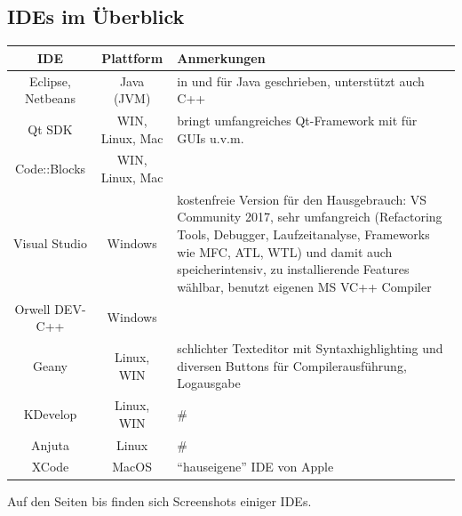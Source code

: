 \documentclass[a4paper]{report}
\begin{document}
\subsection{IDEs im Überblick}
\begin{center}
\begin{tabular}{|c|c|p{10cm}|}
	\hline
	\textbf{IDE} & \textbf{Plattform} & \textbf{Anmerkungen}\\
	\hline
	Eclipse, Netbeans & Java (JVM) & in und für Java geschrieben, unterstützt auch C++ \\
	Qt SDK & WIN, Linux, Mac & bringt umfangreiches Qt-Framework mit für GUIs u.v.m. \\
	Code::Blocks & WIN, Linux, Mac & \\
	\hline
	Visual Studio & Windows & kostenfreie Version für den Hausgebrauch: VS Community 2017, sehr umfangreich (Refactoring Tools, Debugger, Laufzeitanalyse, Frameworks wie MFC, ATL, WTL) und damit auch speicherintensiv, zu installierende Features wählbar, benutzt eigenen MS VC++ Compiler\\
	Orwell DEV-C++ & Windows &\\
	\hline
	Geany & Linux, WIN & schlichter Texteditor mit Syntaxhighlighting und diversen Buttons für Compilerausführung, Logausgabe\\
	KDevelop & Linux, WIN & \# \\ %
	Anjuta & Linux & \# \\ %
	\hline
	XCode & MacOS & "`hauseigene"' IDE von Apple\\
	\hline
	
\end{tabular}

\vspace{4ex}

Auf den Seiten \pageref{begin:ide:picts} bis \pageref{end:ide:picts} finden sich Screenshots einiger IDEs.


\end{center}
\end{document}
